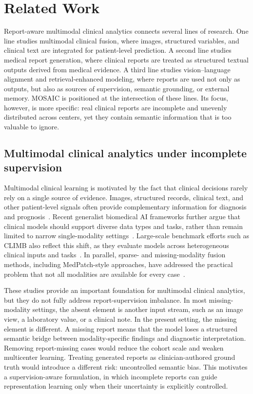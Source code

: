 \documentclass[11pt, a4paper]{article}
\theoremstyle{plain}
\theoremstyle{definition}
\begin{document}
\section{Related Work}
\label{sec:related_work}

Report-aware multimodal clinical analytics connects several lines of research. One line studies multimodal clinical fusion, where images, structured variables, and clinical text are integrated for patient-level prediction. A second line studies medical report generation, where clinical reports are treated as structured textual outputs derived from medical evidence. A third line studies vision--language alignment and retrieval-enhanced modeling, where reports are used not only as outputs, but also as sources of supervision, semantic grounding, or external memory. MOSAIC is positioned at the intersection of these lines. Its focus, however, is more specific: real clinical reports are incomplete and unevenly distributed across centers, yet they contain semantic information that is too valuable to ignore.

\subsection{Multimodal clinical analytics under incomplete supervision}

Multimodal clinical learning is motivated by the fact that clinical decisions rarely rely on a single source of evidence. Images, structured records, clinical text, and other patient-level signals often provide complementary information for diagnosis and prognosis~\cite{acosta2022multimodal}. Recent generalist biomedical AI frameworks further argue that clinical models should support diverse data types and tasks, rather than remain limited to narrow single-modality settings~\cite{moor2023gmai,tu2024generalist_biomedical_ai}. Large-scale benchmark efforts such as CLIMB also reflect this shift, as they evaluate models across heterogeneous clinical inputs and tasks~\cite{dai2025climb}. In parallel, sparse- and missing-modality fusion methods, including MedPatch-style approaches, have addressed the practical problem that not all modalities are available for every case~\cite{aljorf2025medpatch}.

These studies provide an important foundation for multimodal clinical analytics, but they do not fully address report-supervision imbalance. In most missing-modality settings, the absent element is another input stream, such as an image view, a laboratory value, or a clinical note. In the present setting, the missing element is different. A missing report means that the model loses a structured semantic bridge between modality-specific findings and diagnostic interpretation. Removing report-missing cases would reduce the cohort scale and weaken multicenter learning. Treating generated reports as clinician-authored ground truth would introduce a different risk: uncontrolled semantic bias. This motivates a supervision-aware formulation, in which incomplete reports can guide representation learning only when their uncertainty is explicitly controlled.
\end{document}
